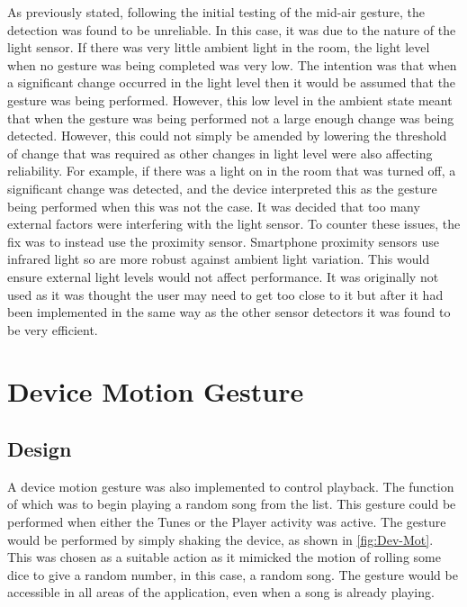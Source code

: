 \documentclass{l4proj}
\begin{document}
As previously stated, following the initial testing of the mid-air gesture, the detection was found to be unreliable. In this case, it was due to the nature of the light sensor. If there was very little ambient light in the room, the light level when no gesture was being completed was very low. The intention was that when a significant change occurred in the light level then it would be assumed that the gesture was being performed. However, this low level in the ambient state meant that when the gesture was being performed not a large enough change was being detected. However, this could not simply be amended by lowering the threshold of change that was required as other changes in light level were also affecting reliability. For example, if there was a light on in the room that was turned off, a significant change was detected, and the device interpreted this as the gesture being performed when this was not the case. It was decided that too many external factors were interfering with the light sensor. To counter these issues, the fix was to instead use the proximity sensor. Smartphone proximity sensors use infrared light so are more robust against ambient light variation. This would ensure external light levels would not affect performance. It was originally not used as it was thought the user may need to get too close to it but after it had been implemented in the same way as the other sensor detectors it was found to be very efficient.


\section{Device Motion Gesture}

\subsection{Design}
A device motion gesture was also implemented to control playback. The function of which was to begin playing a random song from the list. This gesture could be performed when either the Tunes or the Player activity was active. The gesture would be performed by simply shaking the device, as shown in \autoref{fig:Dev-Mot}. This was chosen as a suitable action as it mimicked the motion of rolling some dice to give a random number, in this case, a random song. The gesture would be accessible in all areas of the application, even when a song is already playing.
\end{document}

